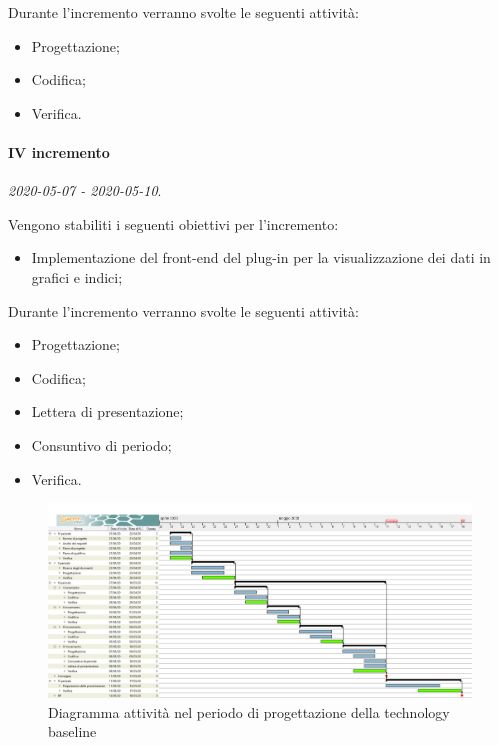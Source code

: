 \documentclass[../piano-di-progetto.tex]{subfiles}
\begin{document}
Durante l'incremento verranno svolte le seguenti attività: 
\begin{itemize}
    \item Progettazione;
    \item Codifica;
    \item Verifica.
\end{itemize}


\paragraph{IV incremento}
\emph{2020-05-07 - 2020-05-10}. 
 
 Vengono stabiliti i seguenti obiettivi per l'incremento:
 \begin{itemize}
     \item Implementazione del front-end del plug-in per la visualizzazione dei dati in grafici e indici;
 \end{itemize}

Durante l'incremento verranno svolte le seguenti attività: 
\begin{itemize}
    \item Progettazione;
    \item Codifica;
    \item Lettera di presentazione;
    \item Consuntivo di periodo;
    \item Verifica.
\end{itemize}



\newpage
\begin{landscape}
    \begin{figure}[H]
        \centering
        \includegraphics[width=24cm]{img/progettazione.png}
        \caption{Diagramma attività nel periodo di progettazione della technology baseline}
      \end{figure}
\end{landscape}
\end{document}
